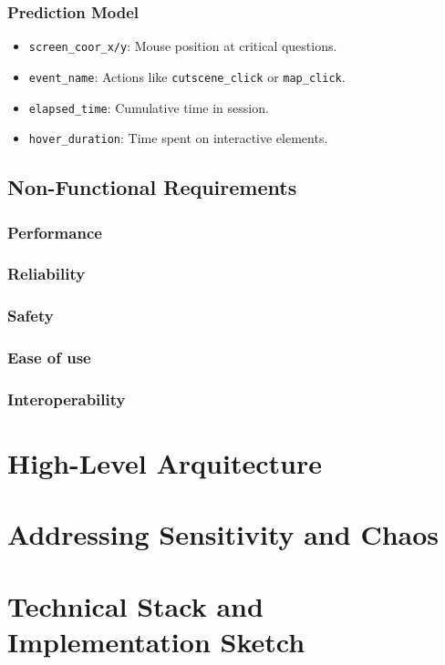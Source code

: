 \documentclass{article}
\newcommand{\reqnum}[1]{\textbf{\underline{RF-#1}}}
\begin{document}
\subsubsection{Prediction Model}
\begin{itemize}
    \item[\reqnum{011}] \texttt{screen\_coor\_x/y}: Mouse position at critical questions.
    \item[\reqnum{012}] \texttt{event\_name}: Actions like \texttt{cutscene\_click} or \texttt{map\_click}.
    \item[\reqnum{013}] \texttt{elapsed\_time}: Cumulative time in session.
    \item[\reqnum{014}] \texttt{hover\_duration}: Time spent on interactive elements.
\end{itemize}

\subsection{Non-Functional Requirements}
\subsubsection{Performance}
\subsubsection{Reliability}
\subsubsection{Safety}
\subsubsection{Ease of use}
\subsubsection{Interoperability}
    

\section{High-Level Arquitecture}

\section{Addressing Sensitivity and Chaos}

\section{Technical Stack and Implementation Sketch}
\end{document}
